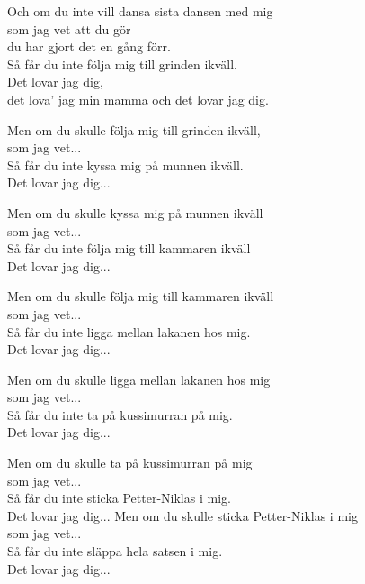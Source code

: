 \vspace{8pt}
Och om du inte vill dansa sista dansen med mig\\
som jag vet att du gör\\
du har gjort det en gång förr.\\
Så får du inte följa mig till grinden ikväll.\\
Det lovar jag dig,\\
det lova' jag min mamma och det lovar jag dig.\par
\vspace{8pt}
Men om du skulle följa mig till grinden ikväll,\\
som jag vet...\\
Så får du inte kyssa mig på munnen ikväll.\\
Det lovar jag dig...\par
\vspace{8pt}
Men om du skulle kyssa mig på munnen ikväll \\
som jag vet...\\
Så får du inte följa mig till kammaren ikväll\\
Det lovar jag dig...\par
\vspace{8pt}
Men om du skulle följa mig till kammaren ikväll\\
som jag vet...\\
Så får du inte ligga mellan lakanen hos mig.\\
Det lovar jag dig...\par
\vspace{8pt}
Men om du skulle ligga mellan lakanen hos mig\\
som jag vet...\\
Så får du inte ta på kussimurran på mig.\\
Det lovar jag dig...\par
\vspace{8pt}
Men om du skulle ta på kussimurran på mig\\
som jag vet...\\
Så får du inte sticka Petter-Niklas i mig.\\
Det lovar jag dig...
\newpage
Men om du skulle sticka Petter-Niklas i mig\\
som jag vet...\\
Så får du inte släppa hela satsen i mig.\\
Det lovar jag dig...\par
\vspace{10pt}
